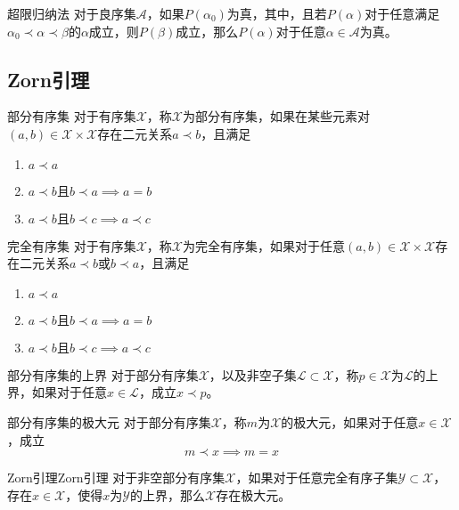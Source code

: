 \documentclass[lang = cn, scheme = chinese, thmcnt = section]{elegantbook}
\newcommand{\sub}{\subset}             %
\begin{document}
\begin{theorem}{超限归纳法}
	对于良序集$\mathscr{A}$，如果$P(\alpha_0)$为真，其中，且若$P(\alpha)$对于任意满足$\alpha_0\prec \alpha \prec \beta$的$\alpha$成立，则$P(\beta)$成立，那么$P(\alpha)$对于任意$\alpha\in\mathscr{A}$为真。
\end{theorem}

\subsection{Zorn引理}

\begin{definition}{部分有序集}
	对于有序集$\mathscr{X}$，称$\mathscr{X}$为部分有序集，如果在某些元素对$(a,b)\in\mathscr{X}\times\mathscr{X}$存在二元关系$a\prec b$，且满足
	\begin{enumerate}
		\item $a\prec a$
		\item $a\prec b\text{且}b\prec a\implies a=b$
		\item $a\prec b\text{且}b\prec c\implies a\prec c$
	\end{enumerate}
\end{definition}

\begin{definition}{完全有序集}
	对于有序集$\mathscr{X}$，称$\mathscr{X}$为完全有序集，如果对于任意$(a,b)\in\mathscr{X}\times\mathscr{X}$存在二元关系$a\prec b$或$b\prec a$，且满足
	\begin{enumerate}
		\item $a\prec a$
		\item $a\prec b\text{且}b\prec a\implies a=b$
		\item $a\prec b\text{且}b\prec c\implies a\prec c$
	\end{enumerate}
\end{definition}

\begin{definition}{部分有序集的上界}
	对于部分有序集$\mathscr{X}$，以及非空子集$\mathscr{L}\sub\mathscr{X}$，称$p\in\mathscr{X}$为$\mathscr{L}$的上界，如果对于任意$x\in\mathscr{L}$，成立$x\prec p$。
\end{definition}

\begin{definition}{部分有序集的极大元}
	对于部分有序集$\mathscr{X}$，称$m$为$\mathscr{X}$的极大元，如果对于任意$x\in\mathscr{X}$，成立
	$$
	m\prec x\implies m=x
	$$
\end{definition}

\begin{theorem}{Zorn引理}{Zorn引理}
	对于非空部分有序集$\mathscr{X}$，如果对于任意完全有序子集$\mathscr{Y}\sub\mathscr{X}$，存在$x\in\mathscr{X}$，使得$x$为$\mathscr{Y}$的上界，那么$\mathscr{X}$存在极大元。
\end{theorem}
\end{document}
